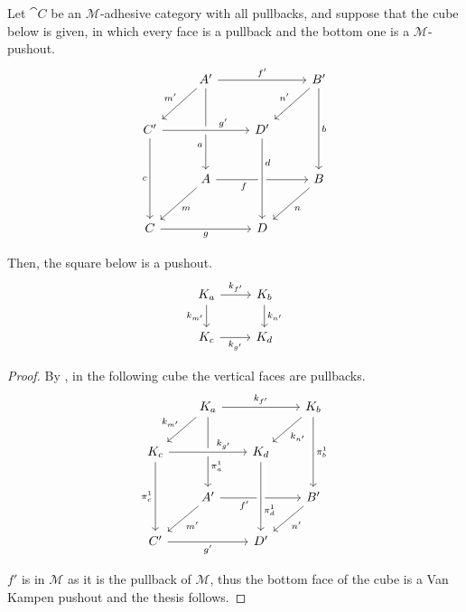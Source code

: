 \color{black}

\begin{lemma}\label{lemma:pushouts_kernel_pairs}
    Let $\cat C$ be an  $\mathcal{M}$-adhesive category with all pullbacks, and suppose that the cube below is given, in which every face is a pullback and the bottom one is a $\mathcal{M}$-pushout.
        \[\begin{tikzcd}[row sep=25, column sep=25]
	& {A'} && {B'} \\
	{C'} && {D'} \\
	& A && B \\
	C && D
	\arrow["{f'}", from=1-2, to=1-4]
	\arrow["{m'}"', from=1-2, to=2-1]
	\arrow["a"'{pos=0.7}, from=1-2, to=3-2]
	\arrow["{n'}"', from=1-4, to=2-3]
	\arrow["b", from=1-4, to=3-4]
	\arrow["{g'}"{pos=0.7}, from=2-1, to=2-3, crossing over]
	\arrow["c"', from=2-1, to=4-1]
	\arrow["f"'{pos=0.3}, from=3-2, to=3-4]
	\arrow["d"{pos=0.3}, from=2-3, to=4-3, crossing over]
	\arrow["m", from=3-2, to=4-1]
	\arrow["n", from=3-4, to=4-3]
	\arrow["g"', from=4-1, to=4-3]
    \end{tikzcd}\]
    
    Then, the square below is a pushout.
    \[
        \begin{tikzcd}%
            {K_a} \ar[r, "{k_{f'}}"] \ar[d, "{k_{m'}}"'] & {K_b} \ar[d, "{k_{n'}}"] \\
            {K_c} \ar[r, "{k_{g'}}"'] & {K_d}
        \end{tikzcd}
    \]
\end{lemma}

\begin{proof}
    By , in the following cube the vertical faces are pullbacks.
    \[\begin{tikzcd}[row sep = 20, column sep = 20]
        & {K_a} && {K_b} \\
        {K_c} && {K_d} \\
        & {A'} && {B'} \\
        {C'} && {D'}
        \arrow["{k_{f'}}", from=1-2, to=1-4]
        \arrow["{k_{m'}}"', from=1-2, to=2-1]
        \arrow["{\pi_a^1}"{pos=0.7}, from=1-2, to=3-2]
        \arrow["{k_{n'}}", from=1-4, to=2-3]
        \arrow["{\pi_b^1}", from=1-4, to=3-4]
        \arrow["{k_{g'}}"{pos=0.7}, from=2-1, to=2-3, crossing over]
        \arrow["{\pi_c^1}"', from=2-1, to=4-1]
        \arrow["{f'}"'{pos=0.3}, from=3-2, to=3-4]
        \arrow["{\pi_d^1}"{pos=0.7}, from=2-3, to=4-3, crossing over]
        \arrow["{m'}", from=3-2, to=4-1]
        \arrow["{n'}", from=3-4, to=4-3]
        \arrow["{g'}"', from=4-1, to=4-3]
    \end{tikzcd}\]

	$f'$ is in $\mathcal{M}$ as it is the pullback of $\mathcal{M}$, thus the bottom face of the cube is a Van Kampen pushout and the thesis follows.

\end{proof}


